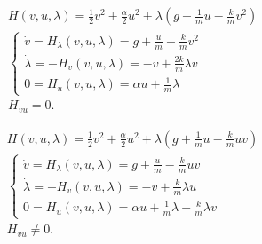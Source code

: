 \documentclass[a4paper, 10pt]{article}
\begin{document}
\begin{minipage}{0.45\textwidth}
\begin{align}
     & H(v,u,\lambda) = \tfrac{1}{2} v^2 + \tfrac{\alpha}{2} u^2 + \lambda (g + \tfrac{1}{m} u - \tfrac{k}{m}v^2) \nonumber \\
     & \begin{cases}
         \dot{v} = H_{\lambda}(v,u,\lambda) =  g + \tfrac{u}{m} - \tfrac{k}{m}v^2  \\
         \dot{\lambda} =  - H_{v}(v,u,\lambda) = -v + \tfrac{2k}{m} \lambda v  \\
         0 =  H_{u}(v,u,\lambda) = \alpha u + \tfrac{1}{m}\lambda
     \end{cases} \label{eq_66} \\
     & H_{vu} = 0. \nonumber
\end{align}
\end{minipage}
\hfill
\begin{minipage}{0.45\textwidth}
\begin{align}
 & H(v,u,\lambda) = \tfrac{1}{2} v^2 + \tfrac{\alpha}{2} u^2 + \lambda (g + \tfrac{1}{m} u - \tfrac{k}{m} uv) \nonumber \\
 & \begin{cases}
     \dot{v} = H_{\lambda}(v,u,\lambda) =  g + \tfrac{u}{m} - \tfrac{k}{m}uv  \\
     \dot{\lambda} =  - H_{v}(v,u,\lambda) = -v + \tfrac{k}{m} \lambda u  \\
     0 =  H_{u}(v,u,\lambda) = \alpha u + \tfrac{1}{m}\lambda - \tfrac{k}{m}\lambda v
 \end{cases} \label{eq_67} \\
 & H_{vu} \neq 0. \nonumber
\end{align}
\end{minipage}
\end{document}

